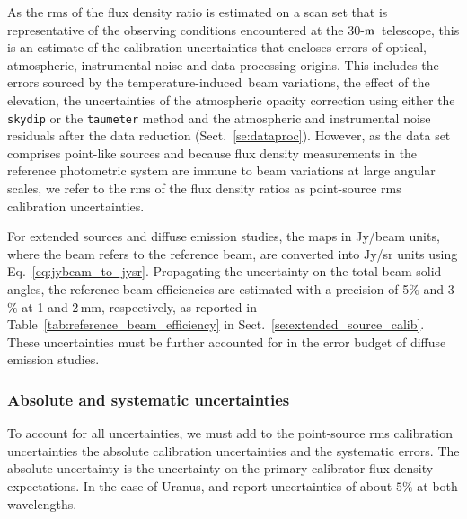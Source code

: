 \documentclass[traditionalabstract]{aa}
\newcommand{\afternoon}{temperature-induced}
\newcommand{\trentemetre}{30-$\rm{m}$}
\newcommand{\lp}[1]{#1}
\newcommand{\rev}[1]{#1}
\begin{document}
{\lp As the rms of the flux density ratio is estimated on a scan set
that is representative of the observing conditions encountered at
the \trentemetre\ telescope, this is an estimate of the
calibration uncertainties that encloses errors of
optical, atmospheric, instrumental noise and data processing
origins. This includes the errors sourced by the \afternoon\ beam 
variations, the effect of the elevation, the uncertainties of the
atmospheric opacity correction using either the {\tt skydip} or
the {\tt taumeter} method and the atmospheric and instrumental noise
residuals after the data reduction (Sect.~\ref{se:dataproc}). {\rev
However, as the data set comprises point-like sources and because flux
density measurements in the reference photometric system are immune to
beam variations at large angular scales, we refer to the rms of the
flux density ratios as point-source rms calibration uncertainties.}

{\rev For extended sources and diffuse emission studies, the maps in
Jy/beam units, where the beam refers to the reference beam, are
converted into Jy/sr units using
Eq.~\ref{eq:jybeam_to_jysr}. Propagating the uncertainty on the
total beam solid angles, the reference beam efficiencies are estimated
with a precision of 5$\%$ and 3$\%$ at 1 and 2\,mm,
respectively, as reported in Table~\ref{tab:reference_beam_efficiency}
in Sect.~\ref{se:extended_source_calib}. These uncertainties must be
further accounted for in the error budget of diffuse emission studies.}


\subsubsection{Absolute and systematic uncertainties}
\label{se:def_systematic_errors}

To account for all uncertainties, we must add to the {\rev
point-source} rms calibration uncertainties the absolute calibration
uncertainties and the systematic errors. The absolute uncertainty is
the uncertainty on the primary calibrator flux density expectations. 
In the case of Uranus, \citet{Morenothesis} and \citet{Bendo2013} report 
uncertainties of about $5\%$ at both wavelengths.

}
\end{document}
